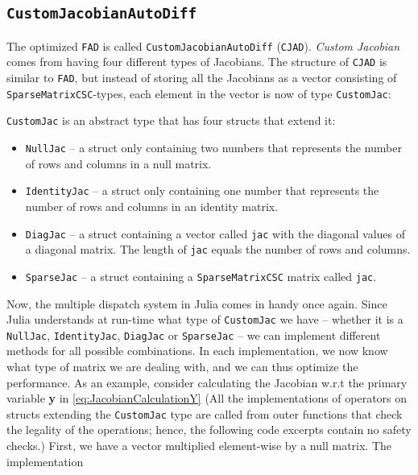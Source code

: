 \subsection{\texttt{CustomJacobianAutoDiff}}
The optimized \texttt{FAD} is called \texttt{CustomJacobianAutoDiff} (\texttt{CJAD}). \textit{Custom Jacobian} comes from having four different types of Jacobians. The structure of \texttt{CJAD} is similar to \texttt{FAD}, but instead of storing all the Jacobians as a vector consisting of \texttt{SparseMatrixCSC}-types, each element in the vector is now of type \texttt{CustomJac}:

\texttt{CustomJac} is an abstract type that has four structs that extend it:
\begin{itemize}
    \item \texttt{NullJac} -- a struct only containing two numbers that represents the number of rows and columns in a null matrix.
    \item \texttt{IdentityJac} -- a struct only containing one number that represents the number of rows and columns in an identity matrix.
    \item \texttt{DiagJac} -- a struct containing a vector called \texttt{jac} with the diagonal values of a diagonal matrix. The length of \texttt{jac} equals the number of rows and columns.
    \item \texttt{SparseJac} -- a struct containing a \texttt{SparseMatrixCSC} matrix called \texttt{jac}.
\end{itemize}
Now, the multiple dispatch system in Julia comes in handy once again. Since Julia understands at run-time what type of \texttt{CustomJac} we have -- whether it is a \texttt{NullJac}, \texttt{IdentityJac}, \texttt{DiagJac} or \texttt{SparseJac} -- we can implement different methods for all possible combinations. In each implementation, we now know what type of matrix we are dealing with, and we can thus optimize the performance. As an example, consider calculating the Jacobian w.r.t the primary variable \textbf{y} in \eqref{eq:JacobianCalculationY} (All the implementations of operators on structs extending the \texttt{CustomJac} type are called from outer functions that check the legality of the operations; hence, the following code excerpts contain no safety checks.) First, we have a vector multiplied element-wise by a null matrix. The implementation

